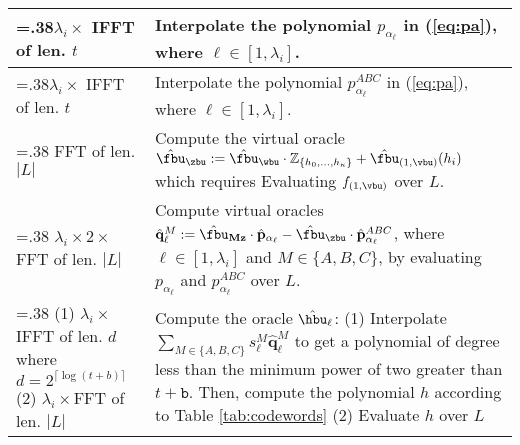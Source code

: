 \begin{table}
{\begin{tabularx}{\linewidth}{>{\hsize=.38\hsize}XX}
			\midrule
			$\lambda_i \times$ IFFT of len. $t$ & Interpolate the polynomial $p_{\alpha_\ell}$ in (\ref{eq:pa}), where $\ell \in [1,\lambda_i]$. 
			\\
			\midrule
			$\lambda_i \times$ IFFT of len. $t$ & Interpolate the polynomial $p^{ABC}_{\alpha_\ell}$ in (\ref{eq:pa}), where $\ell \in [1,\lambda_i]$. 
			\\
			\midrule
			FFT of len. $|L|$ & Compute the virtual oracle $\hat{\fbu}_\zbu := \hat{\fbu}_\wbu \cdot \mathbb{Z}_{\{h_0,\dots, h_{\kappa}\}} + \hat{\fbu}_{(1,\vbu)}(h_i)$ which requires 
			Evaluating $f_{(1,\vbu)}$ over $L$.
			\\
			\midrule
			$\lambda_i \times 2 \times $FFT of len. $|L|$ & Compute virtual oracles $\hat{\mathbf{q}}_\ell^M := \hat{\fbu}_{\mathbf{Mz}}\cdot \hat{\mathbf{p}}_{\alpha_\ell} - \hat{\fbu}_\zbu \cdot \hat{\mathbf{p}}^{ABC}_{\alpha_\ell} $, where $\ell \in [1,\lambda_i]$ and $M \in \{A, B, C\}$, by evaluating $p_{\alpha_\ell}$ and $p^{ABC}_{\alpha_\ell}$ over $L$.
			\\
			\midrule
			(1) $\lambda_i \times $IFFT of len. $d$\newline where $d = 2^{\lceil\log(t+b)\rceil}$ \newline
			(2) $\lambda_i \times $FFT of len.
			$|L|$
			& Compute the oracle $\hat{\hbu}_\ell$:\newline
			(1) Interpolate $\sum_{M \in \{A, B, C\}} s^M_\ell \hat{\mathbf{q}}_\ell^M$ to get a  polynomial of degree less than the minimum power of two greater than $t + \texttt{b}$.%
			Then, compute the polynomial $h$ according to Table \ref{tab:codewords}\newline
			(2) Evaluate $h$ over $L$
			\\
			\bottomrule
		\end{tabularx}
	}
\end{table}













